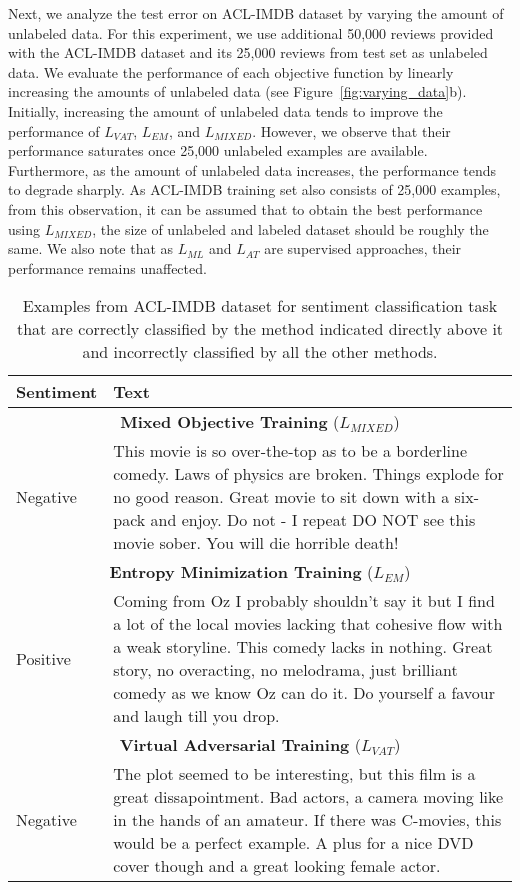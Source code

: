 \documentclass[letterpaper]{article}
\begin{document}
Next, we analyze the test error on ACL-IMDB dataset by varying the amount of unlabeled data. For this experiment, we use additional 50,000 reviews provided with the ACL-IMDB dataset and its 25,000 reviews from test set as unlabeled data. We evaluate the performance of each objective function by linearly increasing the amounts of unlabeled data (see Figure~\ref{fig:varying_data}b). Initially, increasing the amount of unlabeled data tends to improve the performance of $L_{\textit{VAT}}$, $L_{\textit{EM}}$, and $L_{\textit{MIXED}}$. However, we observe that their performance saturates once 25,000 unlabeled examples are available. Furthermore, as the amount of unlabeled data increases, the performance tends to degrade sharply. As ACL-IMDB training set also consists of 25,000 examples, from this observation, it can be assumed that to obtain the best performance using $L_{\textit{MIXED}}$, the size of unlabeled and labeled dataset should be roughly the same. We also note that as $L_{\textit{ML}}$ and $L_{\textit{AT}}$ are supervised approaches, their performance remains unaffected.

\begin{table*}[t]
\begin{minipage}{\linewidth}
\small
\centering
\begin{tabularx}{\linewidth}{@{} l X @{}}
\toprule
\textbf{Sentiment} & \textbf{Text} \\
\midrule
\multicolumn{2}{c}{\textbf{Mixed Objective Training} ($L_{\textit{MIXED}}$)} \\
\midrule
Negative & This movie is so over-the-top as to be a borderline comedy. Laws of physics are broken. Things explode for no good reason. Great movie to sit down with a six-pack and enjoy. Do not - I repeat DO NOT see this movie sober. You will die horrible death!\\
\midrule
\multicolumn{2}{c}{\textbf{Entropy Minimization Training} ($L_{\textit{EM}}$)} \\
\midrule
Positive & Coming from Oz I probably shouldn't say it but I find a lot of the local movies lacking that cohesive flow with a weak storyline. This comedy lacks in nothing. Great story, no overacting, no melodrama, just brilliant comedy as we know Oz can do it. Do yourself a favour and laugh till you drop.\\
\midrule
\multicolumn{2}{c}{\textbf{Virtual Adversarial Training} ($L_{\textit{VAT}}$)} \\
\midrule
Negative & The plot seemed to be interesting, but this film is a great dissapointment. Bad actors, a camera moving like in the hands of an amateur. If there was C-movies, this would be a perfect example. A plus for a nice DVD cover though and a great looking female actor.\\
\bottomrule
\end{tabularx}
\caption{Examples from ACL-IMDB dataset for sentiment classification task that are correctly classified by the method indicated directly above it and incorrectly classified by all the other methods.}
\label{table:examples}
\end{minipage}
\end{table*}
\end{document}
